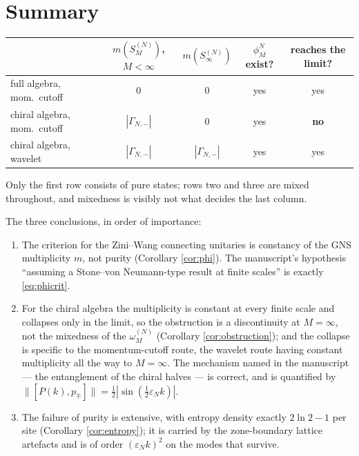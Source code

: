 \documentclass[11pt,a4paper]{article}
\theoremstyle{definition}
\newcommand{\vep}{\varepsilon}
\newcommand{\1}{\mathds{1}}
\newcommand{\Gam}{\Gamma}
\begin{document}
\section{Summary}
\label{sec:summary}

\begin{center}
\small
\begin{tabular}{lcccc}
\toprule
 & $m(S^{(N)}_{M})$, $M<\infty$ & $m(S^{(N)}_{\infty})$ & $\phi^{N}_{M}$ exist? & reaches the limit? \\
\midrule
full algebra, mom.\ cutoff & $0$ & $0$ & yes & yes \\
chiral algebra, mom.\ cutoff & $|\Gam_{N,-}|$ & $0$ & yes & \textbf{no} \\
chiral algebra, wavelet & $|\Gam_{N,-}|$ & $|\Gam_{N,-}|$ & yes & yes \\
\bottomrule
\end{tabular}
\end{center}

\noindent Only the first row consists of pure states; rows two and three are mixed throughout, and mixedness is visibly not what decides the last column.

\medskip

\noindent The three conclusions, in order of importance:
\begin{enumerate}
\item[(1)] The criterion for the Zini--Wang connecting unitaries is constancy of the GNS
multiplicity $m$, not purity (Corollary \ref{cor:phi}). The manuscript's hypothesis ``assuming a
Stone--von Neumann-type result at finite scales'' is exactly \eqref{eq:phicrit}.
\item[(2)] For the chiral algebra the multiplicity is constant at every finite scale and collapses
only in the limit, so the obstruction is a discontinuity at $M=\infty$, not the mixedness of the
$\omega^{(N)}_{M}$ (Corollary \ref{cor:obstruction}); and the collapse is specific to the momentum-cutoff route, the wavelet route having constant multiplicity all the way to $M=\infty$. The mechanism named in the manuscript --- the
entanglement of the chiral halves --- is correct, and is quantified by
$\|[P(k),p_{\mp}]\|=\tfrac{1}{2}|\sin(\tfrac{1}{2}\vep_{N}k)|$.
\item[(3)] The failure of purity is extensive, with entropy density exactly $2\ln2-1$ per site
(Corollary \ref{cor:entropy}); it is carried by the zone-boundary lattice artefacts and is of order
$(\vep_{N}k)^{2}$ on the modes that survive.
\end{enumerate}
\end{document}
